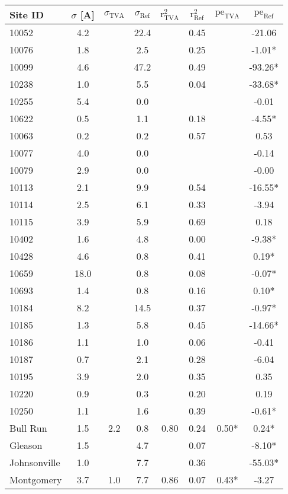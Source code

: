 \begin{tabular}{l c c c c c c c}
Site ID & $\sigma$ [A] & $\sigma_\text{TVA}$ & $\sigma_\text{Ref}$ & $\text{r}^2_\text{TVA}$ & $\text{r}^2_\text{Ref}$ & $\text{pe}_\text{TVA}$ & $\text{pe}_\text{Ref}$ \\
\hline
10052 & 4.2 &  & 22.4 &  & 0.45 &  & -21.06 \\
10076 & 1.8 &  & 2.5 &  & 0.25 &  & -1.01* \\
10099 & 4.6 &  & 47.2 &  & 0.49 &  & -93.26* \\
10238 & 1.0 &  & 5.5 &  & 0.04 &  & -33.68* \\
10255 & 5.4 &  & 0.0 &  &  &  & -0.01 \\
10622 & 0.5 &  & 1.1 &  & 0.18 &  & -4.55* \\
10063 & 0.2 &  & 0.2 &  & 0.57 &  & 0.53 \\
10077 & 4.0 &  & 0.0 &  &  &  & -0.14 \\
10079 & 2.9 &  & 0.0 &  &  &  & -0.00 \\
10113 & 2.1 &  & 9.9 &  & 0.54 &  & -16.55* \\
10114 & 2.5 &  & 6.1 &  & 0.33 &  & -3.94 \\
10115 & 3.9 &  & 5.9 &  & 0.69 &  & 0.18 \\
10402 & 1.6 &  & 4.8 &  & 0.00 &  & -9.38* \\
10428 & 4.6 &  & 0.8 &  & 0.41 &  & 0.19* \\
10659 & 18.0 &  & 0.8 &  & 0.08 &  & -0.07* \\
10693 & 1.4 &  & 0.8 &  & 0.16 &  & 0.10* \\
10184 & 8.2 &  & 14.5 &  & 0.37 &  & -0.97* \\
10185 & 1.3 &  & 5.8 &  & 0.45 &  & -14.66* \\
10186 & 1.1 &  & 1.0 &  & 0.06 &  & -0.41 \\
10187 & 0.7 &  & 2.1 &  & 0.28 &  & -6.04 \\
10195 & 3.9 &  & 2.0 &  & 0.35 &  & 0.35 \\
10220 & 0.9 &  & 0.3 &  & 0.20 &  & 0.19 \\
10250 & 1.1 &  & 1.6 &  & 0.39 &  & -0.61* \\
Bull Run & 1.5 & 2.2 & 0.8 & 0.80 & 0.24 & 0.50* & 0.24* \\
Gleason & 1.5 &  & 4.7 &  & 0.07 &  & -8.10* \\
Johnsonville & 1.0 &  & 7.7 &  & 0.36 &  & -55.03* \\
Montgomery & 3.7 & 1.0 & 7.7 & 0.86 & 0.07 & 0.43* & -3.27 \\

\end{tabular}
